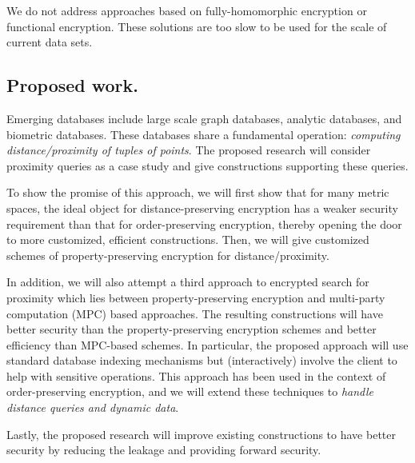 We do not address approaches based on fully-homomorphic encryption or functional encryption.  These solutions are too slow to be used for the scale of current data sets.


\subsection{Proposed work.}
Emerging databases include large scale graph databases, analytic databases, and
biometric databases. These databases share a fundamental operation: {\em
computing distance/proximity of tuples of points}. The proposed research will
consider proximity queries as a case study and give constructions supporting
these queries. 

To show the promise of this approach, we will first show that for many metric
spaces, the ideal object for distance-preserving encryption has a weaker
security requirement than that for order-preserving encryption, thereby opening
the door to more customized, efficient constructions. Then, we will give
customized schemes of property-preserving encryption for distance/proximity. 

In addition, we will also attempt a third approach to encrypted search for
proximity which lies between property-preserving encryption and multi-party
computation (MPC) based approaches. The resulting constructions will have
better security than the property-preserving encryption schemes and better
efficiency than MPC-based schemes. In particular, the proposed approach will
use standard database indexing mechanisms but (interactively) involve the
client to help with sensitive operations. This approach has been used in the
context of order-preserving encryption, and we will extend these techniques to
{\em handle distance queries and dynamic data}.

Lastly, the proposed research will improve existing constructions to have
better security by reducing the leakage and providing forward security.  

%
%


